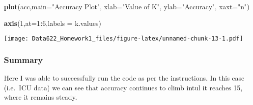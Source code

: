 \documentclass[]{article}
\newenvironment{Shaded}{\begin{snugshade}}{\end{snugshade}}
\newcommand{\KeywordTok}[1]{\textcolor[rgb]{0.13,0.29,0.53}{\textbf{#1}}}
\newcommand{\DataTypeTok}[1]{\textcolor[rgb]{0.13,0.29,0.53}{#1}}
\newcommand{\DecValTok}[1]{\textcolor[rgb]{0.00,0.00,0.81}{#1}}
\newcommand{\StringTok}[1]{\textcolor[rgb]{0.31,0.60,0.02}{#1}}
\newcommand{\OperatorTok}[1]{\textcolor[rgb]{0.81,0.36,0.00}{\textbf{#1}}}
\newcommand{\NormalTok}[1]{#1}
\begin{document}
\begin{Shaded}
\begin{Highlighting}[]
\KeywordTok{plot}\NormalTok{(acc,}\DataTypeTok{main=}\StringTok{"Accuracy Plot"}\NormalTok{,}
        \DataTypeTok{xlab=}\StringTok{"Value of K"}\NormalTok{,}
        \DataTypeTok{ylab=}\StringTok{"Accuracy"}\NormalTok{,}
        \DataTypeTok{xaxt=}\StringTok{"n"}\NormalTok{)}



\KeywordTok{axis}\NormalTok{(}\DecValTok{1}\NormalTok{,}\DataTypeTok{at=}\DecValTok{1}\OperatorTok{:}\DecValTok{6}\NormalTok{,}\DataTypeTok{labels =}\NormalTok{ k.values)}
\end{Highlighting}
\end{Shaded}

\texttt{[image: Data622\_Homework1\_files/figure-latex/unnamed-chunk-13-1.pdf]}

\subsubsection{Summary}\label{summary}

Here I was able to successfully run the code as per the instructions. In
this case (i.e.~ICU data) we can see that accuracy continues to climb
intul it reaches 15, where it remains steady.
\end{document}
